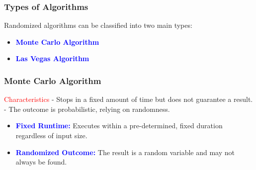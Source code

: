 \begin{frame}
    \frametitle{Types of Algorithms}
    \vspace{0.4cm} %
    
        Randomized algorithms can be classified into two main types:
    \vspace{0.4cm} %

    \begin{itemize}
        \item \textbf{\textcolor{blue}{Monte Carlo Algorithm}}
        \vspace{0.3cm} %
        
        \item \textbf{\textcolor{blue}{Las Vegas Algorithm}}
    \end{itemize}
    
    \vspace{0.5cm} %
\end{frame}


\begin{frame}
    \frametitle{Monte Carlo Algorithm}
    \vspace{0.4cm} %
    
    \begin{block}{\textcolor{red}{Characteristics}}
        - Stops in a fixed amount of time but does not guarantee a result. \\
        - The outcome is probabilistic, relying on randomness.
    \end{block}
    \vspace{0.4cm} %

    \begin{itemize}
        \item \textbf{\textcolor{blue}{Fixed Runtime:}} 
        Executes within a pre-determined, fixed duration regardless of input size.
        \vspace{0.3cm} %
        
        \item \textbf{\textcolor{blue}{Randomized Outcome:}} 
        The result is a random variable and may not always be found.
    \end{itemize}
    
    \vspace{0.5cm} %
\end{frame}


